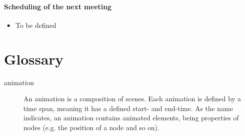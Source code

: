 \documentclass[10pt, openright, notitlepage]{scrreprt}
\begin{document}
\subsubsection{Scheduling of the next meeting}
\label{sec:org46b422b}

\begin{itemize}
\item To be defined
\end{itemize}

\chapter{Glossary}
\label{sec:org0a427c7}

\begin{description}
\item[{animation}] An animation is a composition of scenes. Each animation is
defined by a time span, meaning it has a defined start- and
end-time. As the name indicates, an animation contains animated
elements, being properties of nodes (e.g. the position of a node
and so on).
\end{description}
\end{document}
